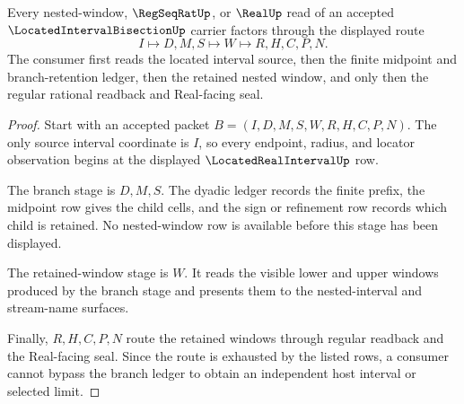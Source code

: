 \begin{theorem}
\label{thm:located-interval-bisection-nested-window-route}
Every nested-window, $\RegSeqRatUp$, or $\RealUp$ read of an accepted $\LocatedIntervalBisectionUp$ carrier factors through the displayed route
$$
I \longmapsto D,M,S \longmapsto W \longmapsto R,H,C,P,N .
$$
The consumer first reads the located interval source, then the finite midpoint and branch-retention ledger, then the retained nested window, and only then the regular rational readback and Real-facing seal.
\end{theorem}
\begin{proof}
Start with an accepted packet $B=(I,D,M,S,W,R,H,C,P,N)$. The only source interval coordinate is $I$, so every endpoint, radius, and locator observation begins at the displayed $\LocatedRealIntervalUp$ row.

The branch stage is $D,M,S$. The dyadic ledger records the finite prefix, the midpoint row gives the child cells, and the sign or refinement row records which child is retained. No nested-window row is available before this stage has been displayed.

The retained-window stage is $W$. It reads the visible lower and upper windows produced by the branch stage and presents them to the nested-interval and stream-name surfaces.

Finally, $R,H,C,P,N$ route the retained windows through regular readback and the Real-facing seal. Since the route is exhausted by the listed rows, a consumer cannot bypass the branch ledger to obtain an independent host interval or selected limit.
\end{proof}

